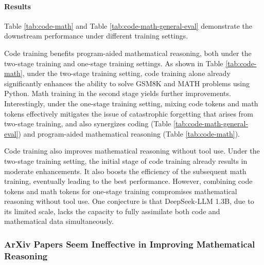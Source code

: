 \endgroup

\paragraph{Results}
Table \ref{tab:code-math} and Table \ref{tab:code-math-general-eval} demonstrate the downstream performance under different training settings.

Code training benefits program-aided mathematical reasoning, both under the two-stage training and one-stage training settings.
As shown in Table \ref{tab:code-math}, under the two-stage training setting, code training alone already significantly enhances the ability to solve GSM8K and MATH problems using Python.
Math training in the second stage yields further improvements.
Interestingly, under the one-stage training setting, mixing code tokens and math tokens effectively mitigates the issue of catastrophic forgetting that arises from two-stage training, and also synergizes coding (Table \ref{tab:code-math-general-eval}) and program-aided mathematical reasoning (Table \ref{tab:code-math}).

Code training also improves mathematical reasoning without tool use.
Under the two-stage training setting, the initial stage of code training already results in moderate enhancements.
It also boosts the efficiency of the subsequent math training, eventually leading to the best performance.
However, combining code tokens and math tokens for one-stage training compromises mathematical reasoning without tool use.
One conjecture is that DeepSeek-LLM 1.3B, due to its limited scale, lacks the capacity to fully assimilate both code and mathematical data simultaneously.

\begingroup
\setlength{\tabcolsep}{3pt} 
\renewcommand{\arraystretch}{1} 

\endgroup

\begingroup
\setlength{\tabcolsep}{3pt} 
\renewcommand{\arraystretch}{1} 


\endgroup

\subsubsection{ArXiv Papers Seem Ineffective in Improving Mathematical Reasoning}

